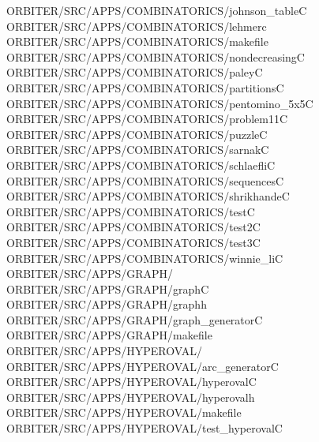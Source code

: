 \begin{tabbing}
ORBITER/SRC/APPS/COMBINATORICS/johnson\_tableC\\[0pt]
ORBITER/SRC/APPS/COMBINATORICS/lehmerc\\[0pt]
ORBITER/SRC/APPS/COMBINATORICS/makefile\\[0pt]
ORBITER/SRC/APPS/COMBINATORICS/nondecreasingC\\[0pt]
ORBITER/SRC/APPS/COMBINATORICS/paleyC\\[0pt]
ORBITER/SRC/APPS/COMBINATORICS/partitionsC\\[0pt]
ORBITER/SRC/APPS/COMBINATORICS/pentomino\_5x5C\\[0pt]
ORBITER/SRC/APPS/COMBINATORICS/problem11C\\[0pt]
ORBITER/SRC/APPS/COMBINATORICS/puzzleC\\[0pt]
ORBITER/SRC/APPS/COMBINATORICS/sarnakC\\[0pt]
ORBITER/SRC/APPS/COMBINATORICS/schlaefliC\\[0pt]
ORBITER/SRC/APPS/COMBINATORICS/sequencesC\\[0pt]
ORBITER/SRC/APPS/COMBINATORICS/shrikhandeC\\[0pt]
ORBITER/SRC/APPS/COMBINATORICS/testC\\[0pt]
ORBITER/SRC/APPS/COMBINATORICS/test2C\\[0pt]
ORBITER/SRC/APPS/COMBINATORICS/test3C\\[0pt]
ORBITER/SRC/APPS/COMBINATORICS/winnie\_liC\\[0pt]
ORBITER/SRC/APPS/GRAPH/\\[0pt]
ORBITER/SRC/APPS/GRAPH/graphC\\[0pt]
ORBITER/SRC/APPS/GRAPH/graphh\\[0pt]
ORBITER/SRC/APPS/GRAPH/graph\_generatorC\\[0pt]
ORBITER/SRC/APPS/GRAPH/makefile\\[0pt]
ORBITER/SRC/APPS/HYPEROVAL/\\[0pt]
ORBITER/SRC/APPS/HYPEROVAL/arc\_generatorC\\[0pt]
ORBITER/SRC/APPS/HYPEROVAL/hyperovalC\\[0pt]
ORBITER/SRC/APPS/HYPEROVAL/hyperovalh\\[0pt]
ORBITER/SRC/APPS/HYPEROVAL/makefile\\[0pt]
ORBITER/SRC/APPS/HYPEROVAL/test\_hyperovalC\\[0pt]

\end{tabbing}
